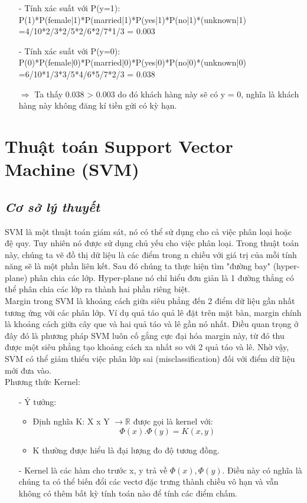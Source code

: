 \documentclass{report}
\begin{document}
    \begin{enumerate}
                \item[- ] Tính xác suất với P(y=1): \\
                P(1)*P(female|1)*P(married|1)*P(yes|1)*P(no|1)*(unknown|1)\\
=4/10*2/3*2/5*2/6*2/7*1/3 = 0.003
                \item[- ] Tính xác suất với P(y=0): \\
            P(0)*P(female|0)*P(married|0)*P(yes|0)*P(no|0)*(unknown|0)\\
=6/10*1/3*3/5*4/6*5/7*2/3 = 0.038
\item [$\Rightarrow$] Ta thấy 0.038 > 0.003 do đó khách hàng này sẽ có y = 0, nghĩa là khách hàng này không đăng kí tiền gửi có kỳ hạn.
     \end{enumerate}           

\fontsize{14}{10}\selectfont
\section{Thuật toán Support Vector Machine (SVM)}
\subsection{\textit{Cơ sở lý thuyết}}
    \fontsize{13}{14}\selectfont
SVM là một thuật toán giám sát, nó có thể sử dụng cho cả việc phân loại hoặc đệ quy. Tuy nhiên nó được sử dụng chủ yếu cho việc phân loại. Trong thuật toán này, chúng ta vẽ đồ thị dữ liệu là các điểm trong n chiều với giá trị của mỗi tính năng sẽ là một phần liên kết. Sau đó chúng ta thực hiện tìm "đường bay" (hyper-plane) phân chia các lớp. Hyper-plane nó chỉ hiểu đơn giản là 1 đường thẳng có thể phân chia các lớp ra thành hai phần riêng biệt.\\
\indent Margin trong SVM là khoảng cách giữa siêu phẳng đến 2 điểm dữ liệu gần nhất tương ứng với các phân lớp. Ví dụ quả táo quả lê đặt trên mặt bàn, margin chính là khoảng cách giữa cây que và hai quả táo và lê gần nó nhất. Điều quan trọng ở đây đó là phương pháp SVM luôn cố gắng cực đại hóa margin này, từ đó thu được một siêu phẳng tạo khoảng cách xa nhất so với 2 quả táo và lê. Nhờ vậy, SVM có thể giảm thiểu việc phân lớp sai (misclassification) đối với điểm dữ liệu mới đưa vào.\\
\indent Phương thức Kernel: 
    \begin{enumerate}
                \item[- ]Ý tưởng:
                \begin{itemize}
                    \item Định nghĩa K: X x Y $ \rightarrow \mathbb {R} $ được gọi là kernel với: $$ \Phi(x). \Phi(y) = K(x,y)$$
                    \item K thường được hiểu là đại lượng đo độ tương đồng.
                \end{itemize}
                \item[- ] Kernel là các hàm cho trước x, y trả về $ \Phi(x), \Phi(y)$. Điều này có nghĩa là chúng ta có thể biến đổi các vectơ đặc trưng thành chiều vô hạn và vẫn không có thêm bất kỳ tính toán nào để tính các điểm chấm.
    \end{enumerate}
\end{document}
